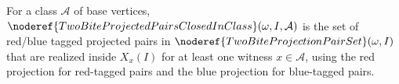 \begin{definition}
For a class \(\mathcal A\) of base vertices,
\(\noderef{TwoBiteProjectedPairsClosedInClass}(\omega,I,\mathcal A)\) is the
set of red/blue tagged projected pairs in
\(\noderef{TwoBiteProjectionPairSet}(\omega,I)\) that are realized inside
\(X_x(I)\) for at least one witness \(x\in\mathcal A\), using the red
projection for red-tagged pairs and the blue projection for blue-tagged pairs.
\end{definition}

